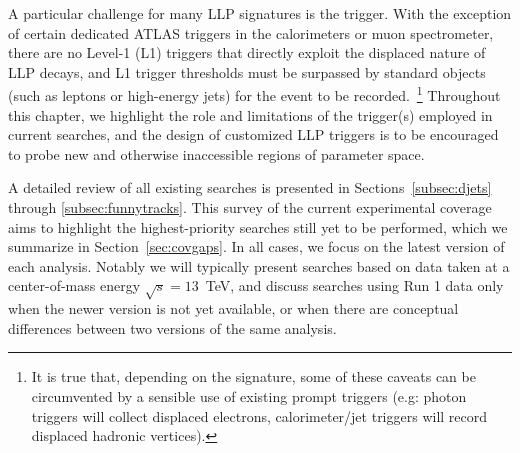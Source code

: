 A particular challenge for many LLP signatures is the trigger. With the exception of certain dedicated ATLAS triggers in the calorimeters or muon spectrometer, there are no Level-1 (L1) triggers that directly exploit the displaced nature of LLP decays, and L1 trigger thresholds must be surpassed by standard objects (such as leptons or high-energy jets) for the event to be recorded.~\footnote{It is true that, depending on the signature, some of these caveats can be circumvented by a sensible use of existing prompt triggers (e.g: photon triggers will collect displaced electrons, calorimeter/jet triggers will record displaced hadronic vertices).} Throughout this chapter, we highlight the role and limitations of the trigger(s) employed in current searches, and the design of customized LLP triggers is to be encouraged to probe new and otherwise inaccessible regions of parameter space.

A detailed review of all existing searches is presented in Sections~\ref{subsec:djets} through \ref{subsec:funnytracks}. This survey of the current experimental coverage aims to highlight the highest-priority searches still yet to be performed, which we summarize in Section~\ref{sec:covgaps}. In all cases, we focus on the latest version of each analysis. Notably we will typically present searches based on data taken at a center-of-mass energy $\sqrt{s}=13$~TeV, and discuss searches using Run 1 data only when the newer version is not yet available, or when there are conceptual differences between two versions of the same analysis.


